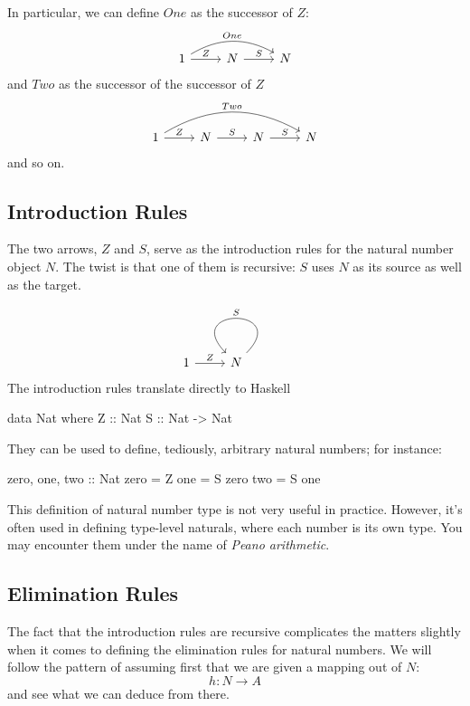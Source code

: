 \documentclass[DaoFP]{subfiles}
\begin{document}
In particular, we can define $One$ as the successor of $Z$:
\[
 \begin{tikzcd}
 1
 \arrow[rr, bend left, "One"]
 \arrow[r, "Z"]
 &N
  \arrow[r, "S"]
&N
  \end{tikzcd}
\]
and $Two$ as the successor of the successor of $Z$
\[
 \begin{tikzcd}
 1
 \arrow[rrr, bend left, "Two"]
 \arrow[r, "Z"]
 &N
  \arrow[r, "S"]
&N
  \arrow[r, "S"]
 &N
 \end{tikzcd}
\]
and so on.

\subsection{Introduction Rules}

The two arrows, $Z$ and $S$, serve as the introduction rules for the natural number object $N$. The twist is that one of them is recursive: $S$ uses $N$ as its source as well as the target.

\[
 \begin{tikzcd}
 1
 \arrow[r, "Z"]
 &N
 \arrow[loop, "S"']
 \end{tikzcd}
\]
The introduction rules translate directly to Haskell


\begin{haskell}
data Nat where
  Z :: Nat
  S :: Nat -> Nat
\end{haskell}
They can be used to define, tediously, arbitrary natural numbers; for instance:

\begin{haskell}
zero, one, two :: Nat
zero = Z
one  = S zero
two  = S one
\end{haskell}

This definition of natural number type is not very useful in practice. However, it's often used in defining type-level naturals, where each number is its own type. You may encounter them under the name of \emph{Peano arithmetic}.

\subsection{Elimination Rules}

The fact that the introduction rules are recursive complicates the matters slightly when it comes to defining the elimination rules for natural numbers. We will follow the pattern of assuming first that we are given a mapping out of $N$:
\[ h \colon N \to A \]
and see what we can deduce from there. 
\end{document}
